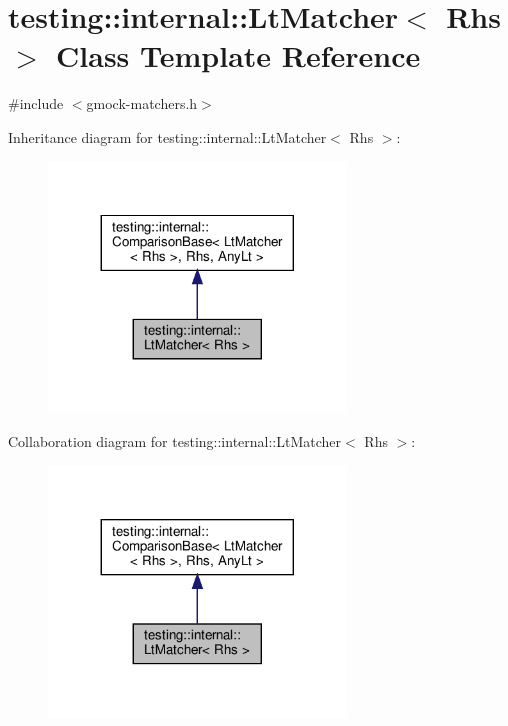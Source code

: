 \hypertarget{classtesting_1_1internal_1_1_lt_matcher}{}\section{testing\+:\+:internal\+:\+:Lt\+Matcher$<$ Rhs $>$ Class Template Reference}
\label{classtesting_1_1internal_1_1_lt_matcher}


{\ttfamily \#include $<$gmock-\/matchers.\+h$>$}



Inheritance diagram for testing\+:\+:internal\+:\+:Lt\+Matcher$<$ Rhs $>$\+:
\nopagebreak
\begin{figure}[H]
\begin{center}
\leavevmode
\includegraphics[width=224pt]{classtesting_1_1internal_1_1_lt_matcher__inherit__graph}
\end{center}
\end{figure}


Collaboration diagram for testing\+:\+:internal\+:\+:Lt\+Matcher$<$ Rhs $>$\+:
\nopagebreak
\begin{figure}[H]
\begin{center}
\leavevmode
\includegraphics[width=224pt]{classtesting_1_1internal_1_1_lt_matcher__coll__graph}
\end{center}
\end{figure}
